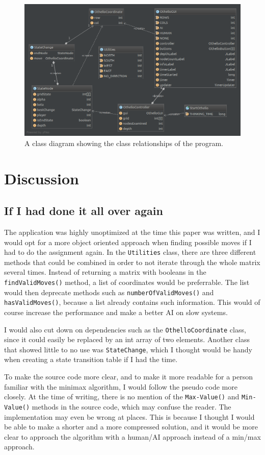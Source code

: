 \documentclass{article}
\begin{document}
\begin{figure}[h]
\includegraphics[width=\textwidth]{diagram.png}
\centering
\caption{A class diagram showing the class relationships of the program.}
\end{figure}

\newpage
\section{Discussion}
\subsection{If I had done it all over again}

The application was highly unoptimized at the time this paper was written, and I would
opt for a more object oriented approach when finding possible moves if I had to do
the assignment again. In the \verb|Utilities| class, there are three different methods
that could be combined in order to not iterate through the whole matrix several times.
Instead of returning a matrix with booleans in the \verb|findValidMoves()| method,
a list of coordinates would be preferrable. The list would then deprecate methods such
as \verb|numberOfValidMoves()| and \verb|hasValidMoves()|, because a list already contains
such information.
This would of course increase the performance and make a better AI on slow systems.

I would also cut down on dependencies such as the \verb|OthelloCoordinate| class,
since it could easily be replaced by an int array of two elements. Another class that
showed little to no use was \verb|StateChange|, which I thought would be handy when
creating a state transition table if I had the time.

To make the source code more clear, and to make it more readable for a person
familiar with the minimax algorithm, I would follow the pseudo code more closely.
At the time of writing, there is no mention of the \verb|Max-Value()| and \verb|Min-Value()|
methods in the source code, which may confuse the reader. The implementation may even be
wrong at places. This is because I thought I would be able to make a shorter and a more
compressed solution, and it would be more clear to approach the algorithm with a
human/AI approach instead of a min/max approach.
\end{document}
